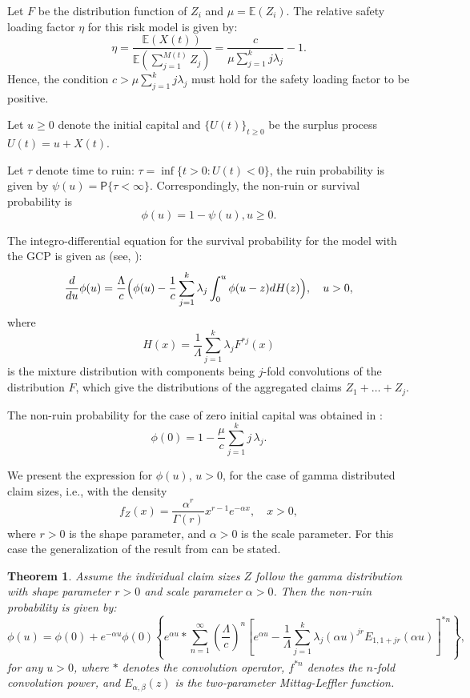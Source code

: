 \documentclass[12pt]{article}
\theoremstyle{definition}
\theoremstyle{plain}
\newtheorem{theorem}{Theorem}
\newcommand{\Prob}{\mathsf{P}}
\begin{document}
Let $F$ be the distribution function of $Z_i$ and  $\mu = \mathbb{E}(Z_i)$. The relative safety loading factor $\eta$ for this risk model is given by:
\begin{equation*}
	\eta = \frac{\mathbb{E}(X(t))}{\mathbb{E} \left( \sum_{j=1}^{M(t)} Z_j \right)} = \frac{c}{\mu \sum_{j=1}^k j \lambda_j} - 1.
\end{equation*}
Hence, the condition $c > \mu \sum_{j=1}^k j \lambda_j$ must hold for the safety loading factor to be positive. 

Let $u \ge 0$ denote the initial capital and $\{U(t)\}_{t \ge 0}$ be the surplus process
$
U(t) = u + X(t).
$

Let $\tau$ denote time to ruin: $\tau=\inf\{t>0:U(t)<0\}$, the ruin probability is given by $\psi(u)=\Prob\{\tau<\infty\}$. Correspondingly, the non-ruin or survival probability is
$$ \phi(u)=1-\psi(u), u\ge 0.$$

The integro-differential equation for the survival probability for the model with the GCP is given as (see, \cite{KK2022b}):
\begin{equation}\label{phi_eq}
	\frac{d}{du}\phi(u) = \frac{\Lambda}{c}\Bigl( \phi(u) - \frac{1}{c} \sum_{j=1}^k \lambda_j \int_0^u \phi(u-z)dH(z)\Bigr), \quad u > 0,
\end{equation}
where 
$$
H(x) =\frac{1}{\Lambda}\sum_{j=1}^k \lambda_j F^{\ast j}(x)
$$
is the mixture distribution with components being $j$-fold convolutions of the distribution $F$, which give the distributions of the aggregated claims $Z_1+\ldots+Z_j$.

The non-ruin probability for the case of zero initial capital was obtained in \cite{KK2022b}:
$$\phi(0)=1-\frac{\mu}{c}\sum_{j=1}^k j\,\lambda_j.
$$

We present the expression for $\phi(u)$, $u>0$, 
for the case of gamma distributed claim sizes, i.e., with the density
\begin{equation*}
	f_Z(x) = \frac{\alpha^r}{\Gamma(r)} x^{r-1} e^{-\alpha x}, \quad x > 0,
\end{equation*}
where $r > 0$ is the shape parameter, and $\alpha > 0$ is the scale parameter. For this case the generalization of the result from \cite{nonruin} can be stated.

\begin{theorem}
	Assume the individual claim sizes $Z$ follow the  gamma distribution with shape parameter $r > 0$ and scale parameter $\alpha > 0$. Then  the non-ruin probability is given by:
	\begin{equation}\label{phiu}
		\phi(u) = \phi(0)+ e^{-\alpha u} \phi(0) \left\{ e^{\alpha u} \ast \sum_{n=1}^{\infty} \left( \frac{\Lambda}{c} \right)^n \left[ e^{\alpha u} - \frac{1}{\Lambda} \sum_{j=1}^k \lambda_j (\alpha u)^{jr} E_{1,1+jr}(\alpha u) \right]^{\ast n} \right\},
	\end{equation}
	for any $u > 0$, where $\ast$ denotes the convolution operator, $f^{\ast n}$ denotes the $n$-fold convolution power, and $E_{\alpha,\beta}(z)$ is the two-parameter Mittag-Leffler function.
\end{theorem}
\end{document}
